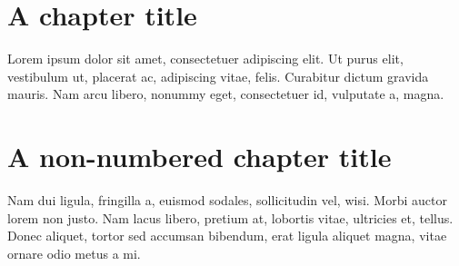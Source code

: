 \documentclass{memoir}
\begin{document}
\chapter{A chapter title}
Lorem ipsum dolor sit amet, consectetuer adipiscing elit. Ut purus
elit, vestibulum ut, placerat ac, adipiscing vitae, felis. Curabitur
dictum gravida mauris. Nam arcu libero, nonummy eget, consectetuer id,
vulputate a, magna.


\chapter*{A non-numbered chapter title}
Nam dui ligula, fringilla a, euismod sodales, sollicitudin vel,
wisi. Morbi auctor lorem non justo. Nam lacus libero, pretium at,
lobortis vitae, ultricies et, tellus. Donec aliquet, tortor sed
accumsan bibendum, erat ligula aliquet magna, vitae ornare odio metus
a mi.
\end{document}
